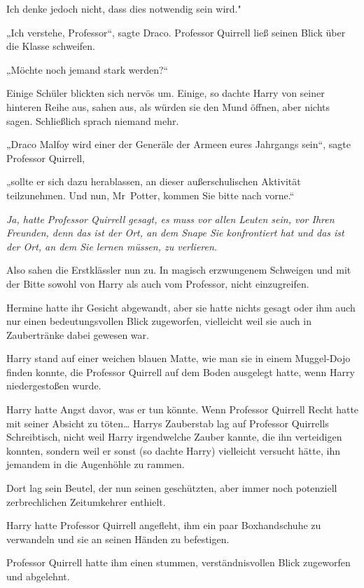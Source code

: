 {Ich denke jedoch nicht, dass dies notwendig sein wird."

„Ich verstehe, Professor“, sagte Draco. Professor Quirrell ließ seinen Blick über die Klasse schweifen.

„Möchte noch jemand stark werden?“

Einige Schüler blickten sich nervös um. Einige, so dachte Harry von seiner hinteren Reihe aus, sahen aus, als würden sie den Mund öffnen, aber nichts sagen. Schließlich sprach niemand mehr.

„Draco Malfoy wird einer der Generäle der Armeen eures Jahrgangs sein“, sagte Professor Quirrell,

„sollte er sich dazu herablassen, an dieser außerschulischen Aktivität teilzunehmen. Und nun, Mr~Potter, kommen Sie bitte nach vorne.“

\emph{Ja, hatte Professor Quirrell gesagt, es muss vor allen Leuten sein, vor Ihren Freunden, denn das ist der Ort, an dem Snape Sie konfrontiert hat und das ist der Ort, an dem Sie lernen müssen, zu verlieren.}

Also sahen die Erstklässler nun zu. In magisch erzwungenem Schweigen und mit der Bitte sowohl von Harry als auch vom Professor, nicht einzugreifen.

Hermine hatte ihr Gesicht abgewandt, aber sie hatte nichts gesagt oder ihm auch nur einen bedeutungsvollen Blick zugeworfen, vielleicht weil sie auch in Zaubertränke dabei gewesen war.

Harry stand auf einer weichen blauen Matte, wie man sie in einem Muggel-Dojo finden konnte, die Professor Quirrell auf dem Boden ausgelegt hatte, wenn Harry niedergestoßen wurde.

Harry hatte Angst davor, was er tun könnte. Wenn Professor Quirrell Recht hatte mit seiner Absicht zu töten… Harrys Zauberstab lag auf Professor Quirrells Schreibtisch, nicht weil Harry irgendwelche Zauber kannte, die ihn verteidigen konnten, sondern weil er sonst (so dachte Harry) vielleicht versucht hätte, ihn jemandem in die Augenhöhle zu rammen.

Dort lag sein Beutel, der nun seinen geschützten, aber immer noch potenziell zerbrechlichen Zeitumkehrer enthielt.

Harry hatte Professor Quirrell angefleht, ihm ein paar Boxhandschuhe zu verwandeln und sie an seinen Händen zu befestigen.

Professor Quirrell hatte ihm einen stummen, verständnisvollen Blick zugeworfen und abgelehnt.

}
